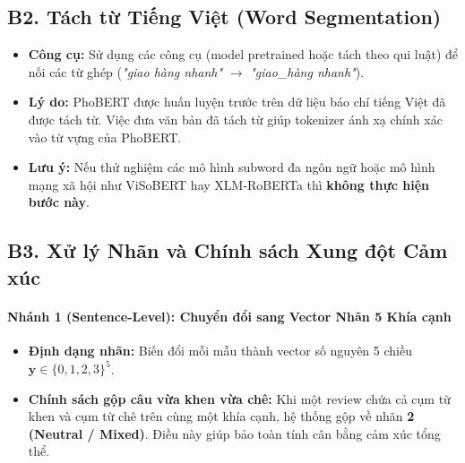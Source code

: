 \documentclass[11pt,a4paper]{article}
\begin{document}

\subsection*{B2. Tách từ Tiếng Việt (Word Segmentation)}
\begin{itemize}
    \item \textbf{Công cụ:} Sử dụng các công cụ (model pretrained hoặc tách theo qui luật) để nối các từ ghép (\textit{"giao hàng nhanh"} $\rightarrow$ \textit{"giao\_hàng nhanh"}).
    \item \textbf{Lý do:} PhoBERT được huấn luyện trước trên dữ liệu báo chí tiếng Việt đã được tách từ. Việc đưa văn bản đã tách từ giúp tokenizer ánh xạ chính xác vào từ vựng của PhoBERT.
    \item \textbf{Lưu ý:} Nếu thử nghiệm các mô hình subword đa ngôn ngữ hoặc mô hình mạng xã hội như ViSoBERT hay XLM-RoBERTa thì \textbf{không thực hiện bước này}.
\end{itemize}

\subsection*{B3. Xử lý Nhãn và Chính sách Xung đột Cảm xúc}

\paragraph{Nhánh 1 (Sentence-Level): Chuyển đổi sang Vector Nhãn 5 Khía cạnh}
\begin{itemize}
    \item \textbf{Định dạng nhãn:} Biến đổi mỗi mẫu thành vector số nguyên 5 chiều $\mathbf{y} \in \{0, 1, 2, 3\}^5$.
    \item \textbf{Chính sách gộp câu vừa khen vừa chê:} Khi một review chứa cả cụm từ khen và cụm từ chê trên cùng một khía cạnh, hệ thống gộp về nhãn \textbf{2 (Neutral / Mixed)}. Điều này giúp bảo toàn tính cân bằng cảm xúc tổng thể.
\end{itemize}
\end{document}
